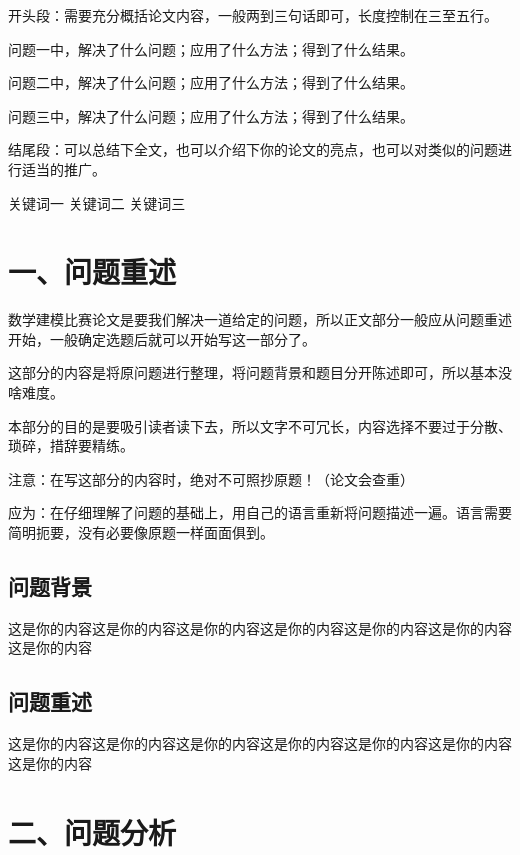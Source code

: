 \documentclass{article}
\begin{document}
\newpage

\begin{center}
\lunwenbiaoti

\vspace{2ex}
\zhaiyao
\end{center}

开头段：需要充分概括论文内容，一般两到三句话即可，长度控制在三至五行。

问题一中，解决了什么问题；应用了什么方法；得到了什么结果。

问题二中，解决了什么问题；应用了什么方法；得到了什么结果。

问题三中，解决了什么问题；应用了什么方法；得到了什么结果。

结尾段：可以总结下全文，也可以介绍下你的论文的亮点，也可以对类似的问题进行适当的推广。

\begin{guanjianci}
关键词一 \quad 关键词二 \quad 关键词三
\end{guanjianci}

\newpage
\section{一、问题重述}
数学建模比赛论文是要我们解决一道给定的问题，所以正文部分一般应从问题重述开始，一般确定选题后就可以开始写这一部分了。

这部分的内容是将原问题进行整理，将问题背景和题目分开陈述即可，所以基本没啥难度。

本部分的目的是要吸引读者读下去，所以文字不可冗长，内容选择不要过于分散、琐碎，措辞要精练。

注意：在写这部分的内容时，绝对不可照抄原题！（论文会查重）

应为：在仔细理解了问题的基础上，用自己的语言重新将问题描述一遍。语言需要简明扼要，没有必要像原题一样面面俱到。

\subsection{问题背景}
这是你的内容这是你的内容这是你的内容这是你的内容这是你的内容这是你的内容这是你的内容
\subsection{问题重述}
这是你的内容这是你的内容这是你的内容这是你的内容这是你的内容这是你的内容这是你的内容
\section{二、问题分析}
\end{document}
